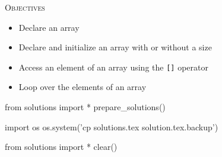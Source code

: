 
\textsc{Objectives}

\begin{itemize}
\item
  Declare an array
\item
  Declare and initialize an array with or without a size
\item
  Access an element of an array using the \texttt{[]} operator
\item
  Loop over the elements of an array
\end{itemize}
















\begin{python0}
from solutions import *
prepare_solutions()
\end{python0}
\begin{python}
import os
os.system('cp solutions.tex solution.tex.backup')  
\end{python}

\begin{python0}
from solutions import *
clear()
\end{python0}
